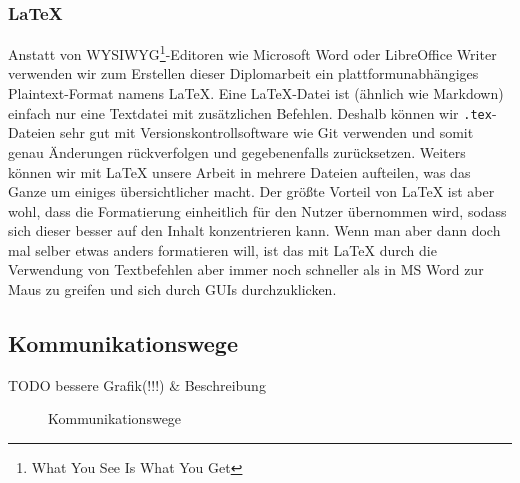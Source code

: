 \subsubsection{\LaTeX}
\label{subsec:latex}
Anstatt von WYSIWYG\footnote{What You See Is What You Get}-Editoren
wie Microsoft Word oder LibreOffice Writer verwenden wir zum Erstellen dieser Diplomarbeit
ein plattformunabhängiges Plaintext-Format namens \LaTeX.
Eine LaTeX-Datei ist (ähnlich wie Markdown) einfach nur eine Textdatei mit zusätzlichen Befehlen.
Deshalb können wir \texttt{.tex}-Dateien sehr gut mit Versionskontrollsoftware wie Git verwenden
und somit genau Änderungen rückverfolgen und gegebenenfalls zurücksetzen.
%
Weiters können wir mit LaTeX unsere Arbeit in mehrere Dateien aufteilen,
was das Ganze um einiges übersichtlicher macht.
%
Der größte Vorteil von LaTeX ist aber wohl,
dass die Formatierung einheitlich für den Nutzer übernommen wird,
sodass sich dieser besser auf den Inhalt konzentrieren kann.
%
Wenn man aber dann doch mal selber etwas anders formatieren will,
ist das mit LaTeX durch die Verwendung von Textbefehlen
aber immer noch schneller als in MS Word zur Maus zu greifen
und sich durch GUIs durchzuklicken. 

\subsection{Kommunikationswege}
\label{subsec:ueberblick_comms}
TODO bessere Grafik(!!!) \& Beschreibung
\begin{figure}[H]
    \centering
    \caption{Kommunikationswege}
    \label{fig:kommunikationswege}
\end{figure}

